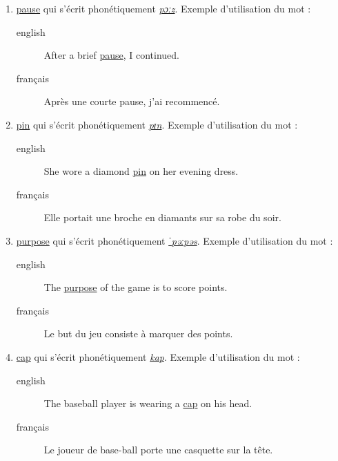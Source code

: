 \documentclass[12pt,a4paper]{book}
\begin{document}
\begin{enumerate}
\item \href{http://www.wordreference.com/enfr/pause}{pause} qui s'écrit phonétiquement \href{https://en.oxforddictionaries.com/definition/pause}{\emph{pɔːz}}. Exemple d'utilisation du mot :
\begin{description}
\item[{english}] \textenglish{After a brief \href{https://youtu.be/v\_UlZ0Y9Vho}{pause}, I continued.}
\item[{français}] Après une courte pause, j'ai recommencé.
\end{description}
\item \href{http://www.wordreference.com/enfr/pin}{pin} qui s'écrit phonétiquement \href{https://en.oxforddictionaries.com/definition/pin}{\emph{pɪn}}. Exemple d'utilisation du mot :
\begin{description}
\item[{english}] \textenglish{She wore a diamond \href{https://youtu.be/DMoeYWQmRuQ}{pin} on her evening dress.}
\item[{français}] Elle portait une broche en diamants sur sa robe du
soir.
\end{description}
\item \href{http://www.wordreference.com/enfr/purpose}{purpose} qui s'écrit phonétiquement \href{https://en.oxforddictionaries.com/definition/purpose}{\emph{ˈpəːpəs}}. Exemple d'utilisation du mot :
\begin{description}
\item[{english}] \textenglish{The \href{https://youtu.be/J8yhsbMULsQ}{purpose} of the game is to score points.}
\item[{français}] Le but du jeu consiste à marquer des points.
\end{description}
\item \href{http://www.wordreference.com/enfr/cap}{cap} qui s'écrit phonétiquement \href{https://en.oxforddictionaries.com/definition/cap}{\emph{kap}}. Exemple d'utilisation du mot :
\begin{description}
\item[{english}] \textenglish{The baseball player is wearing a \href{https://youtu.be/Dkzh8b5Mj3s}{cap} on his head.}
\item[{français}] Le joueur de base-ball porte une casquette sur la
tête.
\end{description}
\end{enumerate}
\end{document}
